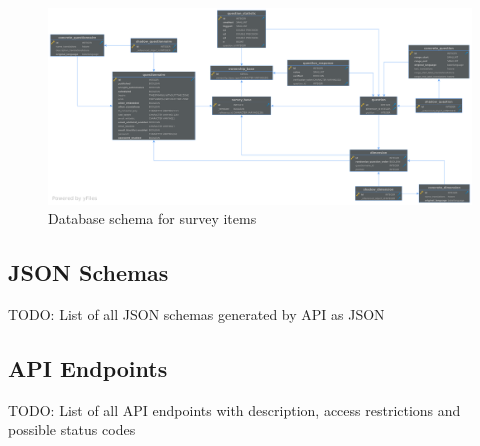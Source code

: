 \documentclass[a4paper,11pt]{article}
\begin{document}
                \begin{landscape}
                    \begin{figure}[H]
                        \centering
                        \includegraphics[width=1.35\textwidth]{schema-surveybase}
                        \caption{Database schema for survey items}
                        \label{fig:schema-surveybase}
                    \end{figure}
                \end{landscape}

            \subsection{JSON Schemas}
                TODO: List of all JSON schemas generated by API as JSON
            \subsection{API Endpoints}
                TODO: List of all API endpoints with description, access restrictions and possible status codes
\end{document}
